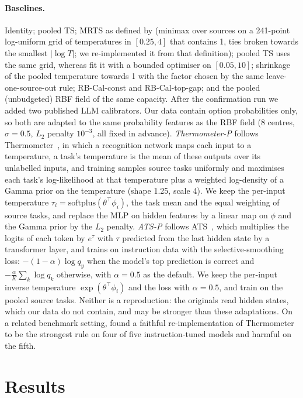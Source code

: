 \documentclass[11pt]{article}
\theoremstyle{remark}
\begin{document}
\paragraph{Baselines.}
Identity; pooled TS; MRTS as defined by \citet{calport2026} (minimax over sources on a 241-point log-uniform grid of temperatures in $[0.25,4]$ that contains 1, ties broken towards the smallest $|\log T|$; we re-implemented it from that definition); pooled TS uses the same grid, whereas \citet{calport2026} fit it with a bounded optimiser on $[0.05,10]$; shrinkage of the pooled temperature towards 1 with the factor chosen by the same leave-one-source-out rule; RB-Cal-const and RB-Cal-top-gap; and the pooled (unbudgeted) RBF field of the same capacity.
After the confirmation run we added two published LLM calibrators.
Our data contain option probabilities only, so both are adapted to the same probability features as the RBF field (8 centres, $\sigma=0.5$, $L_2$ penalty $10^{-3}$, all fixed in advance).
\emph{Thermometer-P} follows Thermometer~\citep{shen2024thermometer}, in which a recognition network maps each input to a temperature, a task's temperature is the mean of these outputs over its unlabelled inputs, and training samples source tasks uniformly and maximises each task's log-likelihood at that temperature plus a weighted log-density of a Gamma prior on the temperature (shape 1.25, scale 4).
We keep the per-input temperature $\tau_i=\mathrm{softplus}(\theta^\top\phi_i)$, the task mean and the equal weighting of source tasks, and replace the MLP on hidden features by a linear map on $\phi$ and the Gamma prior by the $L_2$ penalty.
\emph{ATS-P} follows ATS~\citep{xie2024ats}, which multiplies the logits of each token by $e^{\tau}$ with $\tau$ predicted from the last hidden state by a transformer layer, and trains on instruction data with the selective-smoothing loss: $-(1-\alpha)\log q_y$ when the model's top prediction is correct and $-\frac{\alpha}{K}\sum_k\log q_k$ otherwise, with $\alpha=0.5$ as the default.
We keep the per-input inverse temperature $\exp(\theta^\top\phi_i)$ and the loss with $\alpha=0.5$, and train on the pooled source tasks.
Neither is a reproduction: the originals read hidden states, which our data do not contain, and may be stronger than these adaptations.
On a related benchmark setting, \citet{calport2026} found a faithful re-implementation of Thermometer to be the strongest rule on four of five instruction-tuned models and harmful on the fifth.

\section{Results}\label{sec:results}
\end{document}
